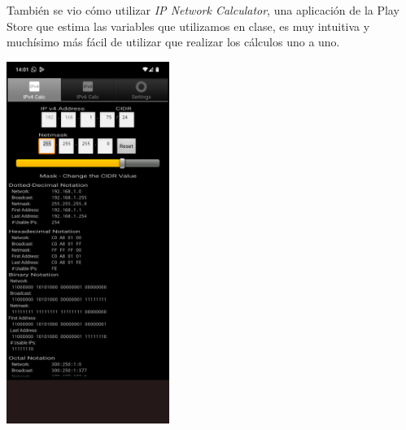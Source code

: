 \documentclass[11pt]{article}
\begin{document}
También se vio cómo utilizar \emph{IP Network
Calculator}, una aplicación de la Play Store que
estima las variables que utilizamos en clase, es
muy intuitiva y muchísimo más fácil de utilizar
que realizar los cálculos uno a uno.

\begin{center}
\includegraphics[width=200px]{./IpvCalc.png}
\end{center}
\end{document}
